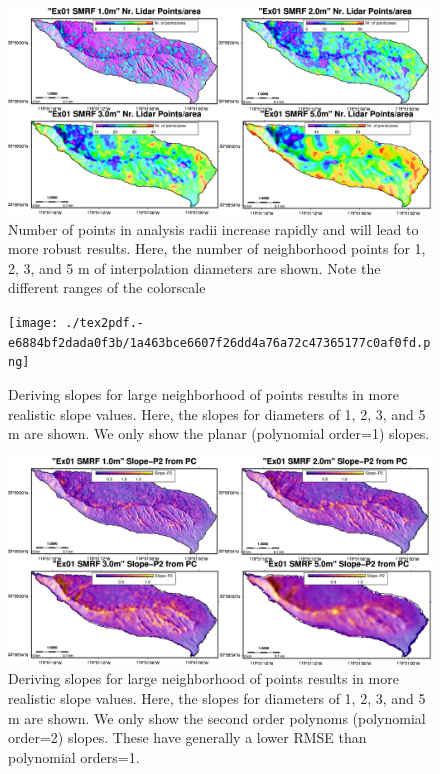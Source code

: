 \documentclass[a4paperpaper,,tablecaptionabove]{scrartcl}
\begin{document}
\begin{figure}
\centering
\includegraphics[width=\textwidth,height=0.9\textheight]{./tex2pdf.-e6884bf2dada0f3b/bcffdba67d4cc0711acb388e0a0030b437927784.png}
\caption{Number of points in analysis radii increase rapidly and will
lead to more robust results. Here, the number of neighborhood points for
1, 2, 3, and 5 m of interpolation diameters are shown. Note the
different ranges of the colorscale \label{Fig:NrLidarPots_1_2_3_5m}}
\end{figure}

\begin{figure}
\centering
\texttt{[image: ./tex2pdf.-e6884bf2dada0f3b/1a463bce6607f26dd4a76a72c47365177c0af0fd.png]}
\caption{Deriving slopes for large neighborhood of points results in
more realistic slope values. Here, the slopes for diameters of 1, 2, 3,
and 5 m are shown. We only show the planar (polynomial order=1) slopes.
\label{Fig:SMRF_slopeP1_1_2_3_5m}}
\end{figure}

\begin{figure}
\centering
\includegraphics[width=\textwidth,height=0.9\textheight]{./tex2pdf.-e6884bf2dada0f3b/30f0466a84ddcdc69609961bea73d7c5d751682f.png}
\caption{Deriving slopes for large neighborhood of points results in
more realistic slope values. Here, the slopes for diameters of 1, 2, 3,
and 5 m are shown. We only show the second order polynoms (polynomial
order=2) slopes. These have generally a lower RMSE than polynomial
orders=1. \label{Fig:SMRF_slopeP2_1_2_3_5m}}
\end{figure}
\end{document}
